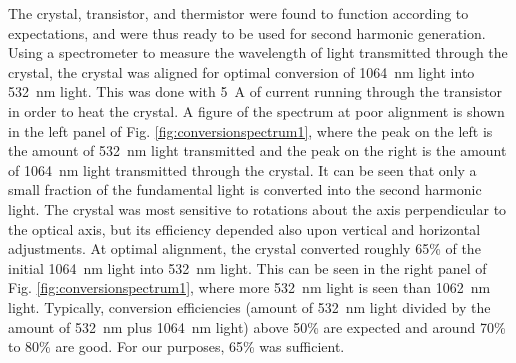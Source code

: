 The crystal, transistor, and thermistor were found to function according to expectations, and were thus ready to be used for second harmonic generation. Using a spectrometer to measure the wavelength of light transmitted through the crystal, the crystal was aligned for optimal conversion of \SI{1064}{\nano \meter} light into \SI{532}{\nano \meter} light. This was done with \SI{5}{ A} of current running through the transistor in order to heat the crystal. A figure of the spectrum at poor alignment is shown in the left panel of Fig. \ref{fig:conversionspectrum1}, where the peak on the left is the amount of \SI{532}{\nano \meter} light transmitted and the peak on the right is the amount of \SI{1064}{\nano \meter} light transmitted through the crystal. It can be seen that only a small fraction of the fundamental light is converted into the second harmonic light. The crystal was most sensitive to rotations about the axis perpendicular to the optical axis, but its efficiency depended also upon vertical and horizontal adjustments. At optimal alignment, the crystal converted roughly 65\% of the initial \SI{1064}{\nano \meter} light into \SI{532}{\nano \meter} light. This can be seen in the right panel of Fig. \ref{fig:conversionspectrum1}, where more \SI{532}{\nano \meter} light is seen than \SI{1062}{\nano \meter} light. Typically, conversion efficiencies (amount of \SI{532}{\nano \meter} light divided by the amount of \SI{532}{\nano \meter} plus \SI{1064}{\nano \meter} light) above 50\% are expected and around 70\% to 80\% are good. For our purposes, 65\% was sufficient.

